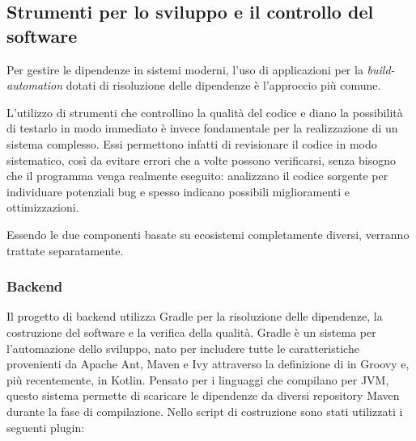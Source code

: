     \subsection{Strumenti per lo sviluppo e il controllo del software}
      Per gestire le dipendenze in sistemi moderni, l'uso di applicazioni per la \emph{build-automation} dotati di risoluzione delle dipendenze è l'approccio più comune.

      L'utilizzo di strumenti che controllino la qualità del codice e diano la possibilità di testarlo in modo immediato è invece fondamentale per la realizzazione di un sistema complesso.
      Essi permettono infatti di revisionare il codice in modo sistematico, così da evitare errori che a volte possono verificarsi, senza bisogno che il programma venga realmente eseguito:
      analizzano il codice sorgente per individuare potenziali bug e spesso indicano possibili miglioramenti e ottimizzazioni.

      Essendo le due componenti basate su ecosistemi completamente diversi, verranno trattate separatamente.

      \subsubsection{Backend}

        Il progetto di backend utilizza Gradle per la risoluzione delle dipendenze, la costruzione del software e la verifica della qualità.
        Gradle è un sistema per l'automazione dello sviluppo, nato per includere tutte le caratteristiche provenienti da Apache Ant, Maven e Ivy attraverso la definizione di  in Groovy e, più recentemente, in Kotlin.
        Pensato per i linguaggi che compilano per JVM, questo sistema permette di scaricare le dipendenze da diversi repository Maven durante la fase di compilazione.
        Nello script di costruzione sono stati utilizzati i seguenti plugin:

